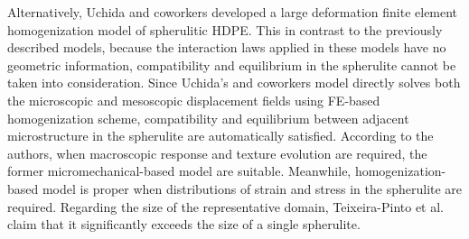 Alternatively, Uchida and coworkers \citep{uchidaMicroMesoMacroscopic2013} developed a large deformation finite element homogenization model of spherulitic HDPE.
This in contrast to the previously described models, because the interaction laws applied in these models have no geometric information, compatibility and equilibrium in the spherulite cannot be taken into consideration.
Since Uchida's and coworkers model directly solves both the microscopic and mesoscopic displacement fields using FE-based homogenization scheme, compatibility and equilibrium between adjacent microstructure in the spherulite are automatically satisfied.
According to the authors, when macroscopic response and texture evolution are required, the former micromechanical-based model are suitable.
Meanwhile, homogenization-based model is proper when distributions of strain and stress in the spherulite are required.
Regarding the size of the representative domain, Teixeira-Pinto et al. \citep{teixeira-pintoSizeEstimationRepresentative2016} claim that it significantly exceeds the size of a single spherulite.


